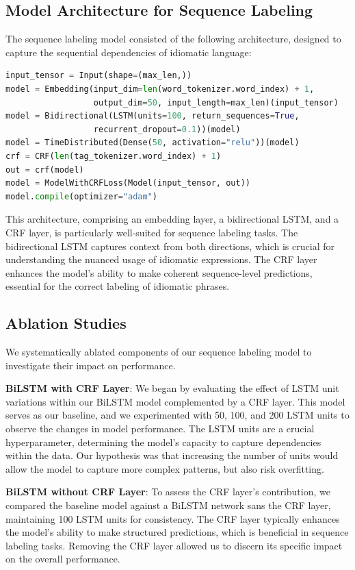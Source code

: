 \documentclass[conference]{IEEEtran}
\begin{document}
\subsection{Model Architecture for Sequence Labeling}
The sequence labeling model consisted of the following architecture, designed to capture the sequential dependencies of idiomatic language:
\begin{lstlisting}[language=Python]
input_tensor = Input(shape=(max_len,))
model = Embedding(input_dim=len(word_tokenizer.word_index) + 1,
                  output_dim=50, input_length=max_len)(input_tensor)
model = Bidirectional(LSTM(units=100, return_sequences=True,
                  recurrent_dropout=0.1))(model)
model = TimeDistributed(Dense(50, activation="relu"))(model)
crf = CRF(len(tag_tokenizer.word_index) + 1)
out = crf(model)
model = ModelWithCRFLoss(Model(input_tensor, out))
model.compile(optimizer="adam")
\end{lstlisting}
This architecture, comprising an embedding layer, a bidirectional LSTM, and a CRF layer, is particularly well-suited for sequence labeling tasks. The bidirectional LSTM captures context from both directions, which is crucial for understanding the nuanced usage of idiomatic expressions. The CRF layer enhances the model's ability to make coherent sequence-level predictions, essential for the correct labeling of idiomatic phrases.

\subsection{Ablation Studies}
We systematically ablated components of our sequence labeling model to investigate their impact on performance.

\textbf{BiLSTM with CRF Layer}: We began by evaluating the effect of LSTM unit variations within our BiLSTM model complemented by a CRF layer. This model serves as our baseline, and we experimented with 50, 100, and 200 LSTM units to observe the changes in model performance. The LSTM units are a crucial hyperparameter, determining the model's capacity to capture dependencies within the data. Our hypothesis was that increasing the number of units would allow the model to capture more complex patterns, but also risk overfitting.

\textbf{BiLSTM without CRF Layer}: To assess the CRF layer's contribution, we compared the baseline model against a BiLSTM network sans the CRF layer, maintaining 100 LSTM units for consistency. The CRF layer typically enhances the model's ability to make structured predictions, which is beneficial in sequence labeling tasks. Removing the CRF layer allowed us to discern its specific impact on the overall performance.
\end{document}
